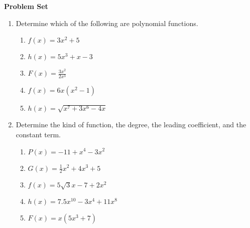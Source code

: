\textbf{Problem Set}

\vspce
\begin{enumerate}[label = \Alph*. ]

\item 
Determine which of the following are polynomial functions. 


\begin{enumerate}[label = \arabic*. ]

\item \hspce \hspce $f(x) = 3x^2+5$
\vspce
\item \hspce \hspce $h(x) =5x^3+x-3$
\vspce
\item \hspce \hspce $F(x) =\displaystyle \frac{3x^2}{2x^3} $
\vspce
\item \hspce \hspce $f(x) =6x(x^2-1)$
\vspce
\item \hspce \hspce $h(x) = \sqrt{x^7+3x^6-4x }  $


\end{enumerate}

\item Determine the kind of function, the degree, the leading coefficient, and the constant term. 

\begin{enumerate}[label = \arabic*. ]
\item \hspce \hspce $P(x) =-11+x^4-3x^2$
\vspce 
\item \hspce \hspce $G(x) =\displaystyle \frac{1}{2}x^2+4x^3+5 $
\vspce 
\item \hspce \hspce $f(x) =5\sqrt{ 3}x-7+2x^2 $
\vspce 
\item \hspce \hspce $h(x) =7.5x^{10}-3x^4+11x^8$
\vspce 
\item \hspce \hspce $F(x) =x(5x^3+7)$
\end{enumerate} 
 



\end{enumerate}
